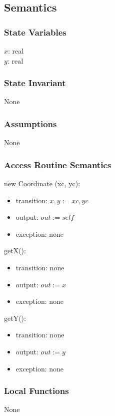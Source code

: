 \documentclass[12pt,fleqn]{article}
\begin{document}
    \subsection* {Semantics}

    \subsubsection* {State Variables}

    $x$: real\\
    $y$: real

    \subsubsection* {State Invariant}
    None

    \subsubsection* {Assumptions}
    None

    \subsubsection* {Access Routine Semantics}

    \noindent new Coordinate (xc, yc):
    \begin{itemize}
    \item transition: $x, y := xc, yc$
    \item output: $out := \mathit{self}$
    \item exception: none
    \end{itemize}

    \noindent getX():
    \begin{itemize}
    \item transition: none 
    \item output: $out := x$
    \item exception: none
    \end{itemize}

    \noindent getY():
    \begin{itemize}
    \item transition: none
    \item output: $out := y$
    \item exception: none
    \end{itemize}

\subsubsection*{Local Functions}
None
\end{document}

